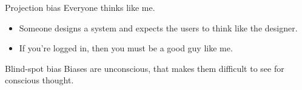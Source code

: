 \begin{frame}
  \begin{block}{Projection bias}
    Everyone thinks like me.
  \end{block}

  \begin{example}
    \begin{itemize}
      \item Someone designs a system and expects the users to think like the 
        designer.
      \item If you're logged in, then you must be a good guy like me.
    \end{itemize}
  \end{example}
\end{frame}

\begin{frame}
  \begin{block}{Blind-spot bias}
    Biases are unconscious, that makes them difficult to see for conscious 
    thought.
  \end{block}
\end{frame}

